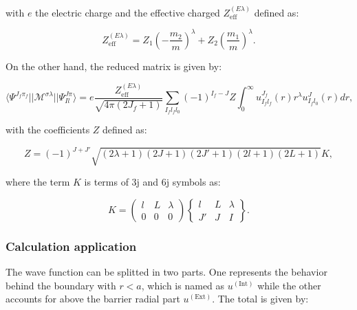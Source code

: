 \documentclass[openany]{book}
\begin{document}
with $e$ the electric charge and the effective charged $Z^{(E\lambda)}_{\mathrm{eff}}$ defined as: 

\begin{equation}\label{rmatrix_radiativeCapture_effectiveCharge}
		Z^{(E\lambda)}_{\mathrm{eff}} = Z_1\left(- \frac{m_2}{m}\right)^{\lambda} + Z_2 \left(\frac{m_1}{m}\right)^{\lambda}.
\end{equation}

On the other hand, the reduced matrix is given by: 

\begin{equation}\label{rmatrix_radiativeCapture_reducedMatrix_expression}
	\langle \Psi^{J_f\pi_f} || \mathcal{M}^{\sigma \lambda} ||  \Psi^{J \pi}_{Il} \rangle = e \frac{Z^{(E\lambda)}_{\mathrm{eff}}}{\sqrt{4\pi (2J_f + 1)}} \sum_{I_fl_fl_0}(-1)^{I_f - J} Z \int_0^{\infty} {u^{J_f}_{I_fl_f}(r) r^\lambda u^{J}_{I_fl_0} (r)dr}, 
\end{equation}

with the coefficients $Z$ defined as: 

\begin{equation}\label{rmatrix_radiativeCapture_Zcoefficients}
	Z = (-1)^{J + J'} \sqrt{(2\lambda + 1)(2J+ 1)(2J' + 1)(2l + 1)(2L + 1)} K ,
\end{equation}

where the term $K$ is terms of 3j and 6j symbols as: 

\begin{equation}\label{rmatrix_radiativeCapture_3j6j}
	K  = \left(\begin{matrix}
		l & L & \lambda \\
		0 & 0 & 0
	\end{matrix}\right) \left\{ \begin{matrix}
		l & L & \lambda \\
		J' & J & I
\end{matrix} \right\}.
\end{equation}

\subsubsection{Calculation application} \label{ssub:rmatrix_calculable_calculationapplication}

The wave function can be splitted in two parts. One represents the behavior behind the boundary with $r < a$, which is named as $u^{(\mathrm{Int})}$ while the other accounts for above the barrier radial part $u^{(\mathrm{Ext})}$. The total is given by: 
\end{document}
